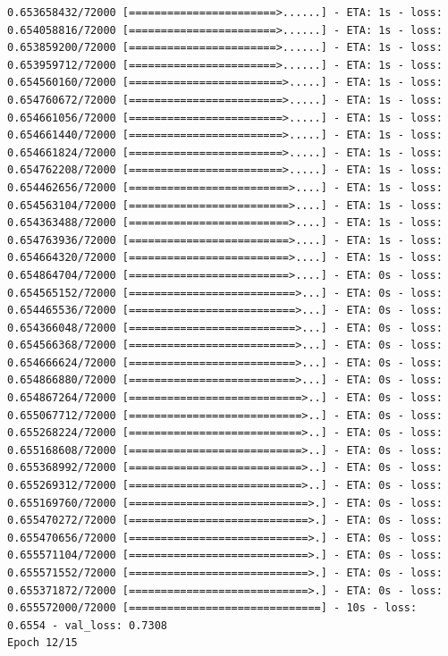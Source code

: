 \documentclass[12pt,fleqn]{article}\usepackage{../../common}
\begin{document}
\begin{verbatim}
0.653658432/72000 [=======================>......] - ETA: 1s - loss: 0.654058816/72000 [=======================>......] - ETA: 1s - loss: 0.653859200/72000 [=======================>......] - ETA: 1s - loss: 0.653959712/72000 [=======================>......] - ETA: 1s - loss: 0.654560160/72000 [========================>.....] - ETA: 1s - loss: 0.654760672/72000 [========================>.....] - ETA: 1s - loss: 0.654661056/72000 [========================>.....] - ETA: 1s - loss: 0.654661440/72000 [========================>.....] - ETA: 1s - loss: 0.654661824/72000 [========================>.....] - ETA: 1s - loss: 0.654762208/72000 [========================>.....] - ETA: 1s - loss: 0.654462656/72000 [=========================>....] - ETA: 1s - loss: 0.654563104/72000 [=========================>....] - ETA: 1s - loss: 0.654363488/72000 [=========================>....] - ETA: 1s - loss: 0.654763936/72000 [=========================>....] - ETA: 1s - loss: 0.654664320/72000 [=========================>....] - ETA: 1s - loss: 0.654864704/72000 [=========================>....] - ETA: 0s - loss: 0.654565152/72000 [==========================>...] - ETA: 0s - loss: 0.654465536/72000 [==========================>...] - ETA: 0s - loss: 0.654366048/72000 [==========================>...] - ETA: 0s - loss: 0.654566368/72000 [==========================>...] - ETA: 0s - loss: 0.654666624/72000 [==========================>...] - ETA: 0s - loss: 0.654866880/72000 [==========================>...] - ETA: 0s - loss: 0.654867264/72000 [===========================>..] - ETA: 0s - loss: 0.655067712/72000 [===========================>..] - ETA: 0s - loss: 0.655268224/72000 [===========================>..] - ETA: 0s - loss: 0.655168608/72000 [===========================>..] - ETA: 0s - loss: 0.655368992/72000 [===========================>..] - ETA: 0s - loss: 0.655269312/72000 [===========================>..] - ETA: 0s - loss: 0.655169760/72000 [============================>.] - ETA: 0s - loss: 0.655470272/72000 [============================>.] - ETA: 0s - loss: 0.655470656/72000 [============================>.] - ETA: 0s - loss: 0.655571104/72000 [============================>.] - ETA: 0s - loss: 0.655571552/72000 [============================>.] - ETA: 0s - loss: 0.655371872/72000 [============================>.] - ETA: 0s - loss: 0.655572000/72000 [==============================] - 10s - loss: 0.6554 - val_loss: 0.7308
Epoch 12/15

\end{verbatim}
\end{document}

